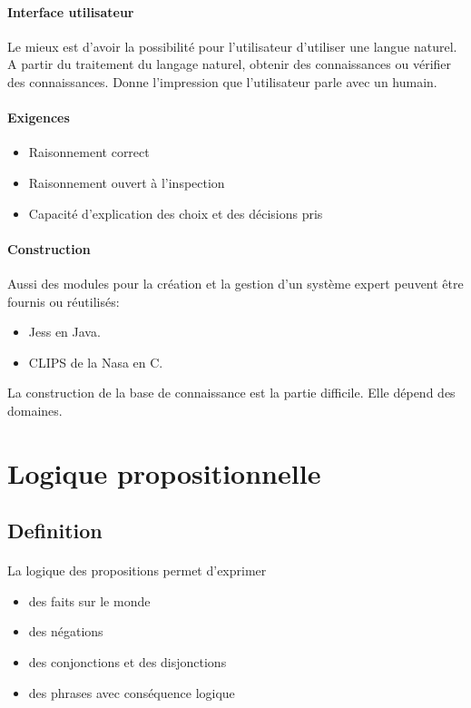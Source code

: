 \documentclass{article}
\begin{document}
\paragraph{Interface utilisateur}
Le mieux est d'avoir la possibilité pour l'utilisateur d'utiliser une langue naturel.
A partir du traitement du langage naturel, obtenir des connaissances ou vérifier des connaissances.
Donne l'impression que l'utilisateur parle avec un humain.

\paragraph{Exigences}
\begin{itemize}
	\item Raisonnement correct
	\item Raisonnement ouvert à l'inspection
	\item Capacité d'explication des choix et des décisions pris
\end{itemize}

\paragraph{Construction}
Aussi des modules pour la création et la gestion d'un système expert peuvent être fournis ou réutilisés:
\begin{itemize}
	\item Jess en Java. 
	\item CLIPS de la Nasa en C.
\end{itemize}
La construction de la base de connaissance est la partie difficile. Elle dépend des domaines.

\newpage

\section{Logique propositionnelle}
\subsection{Definition}
\paragraph{}
La logique des propositions permet d'exprimer
\begin{itemize}
	\item des faits sur le monde
	\item des négations
	\item des conjonctions et des disjonctions
	\item des phrases avec conséquence logique
\end{itemize}
\end{document}
